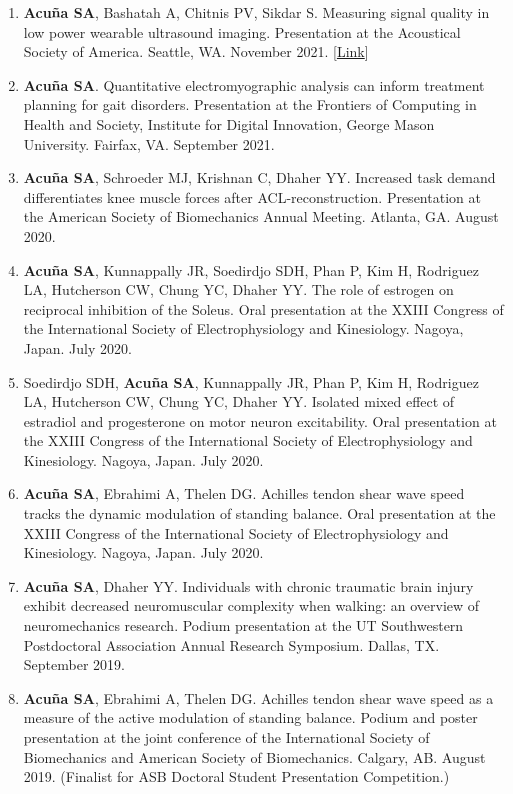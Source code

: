 \documentclass[letterpaper, 10pt]{article}
\begin{document}
\begin{enumerate}
    \item \textbf{Acuña SA}, Bashatah A, Chitnis PV, Sikdar S. Measuring signal quality in low power wearable ultrasound imaging. Presentation at the Acoustical Society of America. Seattle, WA. November 2021. [\href{https://asa.scitation.org/doi/10.1121/10.0007727}{Link}]
    \item \textbf{Acuña SA}. Quantitative electromyographic analysis can inform treatment planning for gait disorders. Presentation at the Frontiers of Computing in Health and Society, Institute for Digital Innovation, George Mason University. Fairfax, VA. September 2021.
    \item \textbf{Acuña SA}, Schroeder MJ, Krishnan C, Dhaher YY. Increased task demand differentiates knee muscle forces after ACL-reconstruction. Presentation at the American Society of Biomechanics Annual Meeting. Atlanta, GA. August 2020.
    \item \textbf{Acuña SA}, Kunnappally JR, Soedirdjo SDH, Phan P, Kim H, Rodriguez LA, Hutcherson CW, Chung YC, Dhaher YY. The role of estrogen on reciprocal inhibition of the Soleus. Oral presentation at the XXIII Congress of the International Society of Electrophysiology and Kinesiology. Nagoya, Japan. July 2020.
    \item Soedirdjo SDH, \textbf{Acuña SA}, Kunnappally JR, Phan P, Kim H, Rodriguez LA, Hutcherson CW, Chung YC, Dhaher YY. Isolated mixed effect of estradiol and progesterone on motor neuron excitability. Oral presentation at the XXIII Congress of the International Society of Electrophysiology and Kinesiology. Nagoya, Japan. July 2020.
    \item \textbf{Acuña SA}, Ebrahimi A, Thelen DG. Achilles tendon shear wave speed tracks the dynamic modulation of standing balance. Oral presentation at the XXIII Congress of the International Society of Electrophysiology and Kinesiology. Nagoya, Japan. July 2020.
    \item \textbf{Acuña SA}, Dhaher YY. Individuals with chronic traumatic brain injury exhibit decreased neuromuscular complexity when walking: an overview of neuromechanics research. Podium presentation at the UT Southwestern Postdoctoral Association Annual Research Symposium. Dallas, TX. September 2019.
    \item \textbf{Acuña SA}, Ebrahimi A, Thelen DG. Achilles tendon shear wave speed as a measure of the active modulation of standing balance. Podium and poster presentation at the joint conference of the International Society of Biomechanics and American Society of Biomechanics. Calgary, AB. August 2019. (Finalist for ASB Doctoral Student Presentation Competition.)

\end{enumerate}
\end{document}
